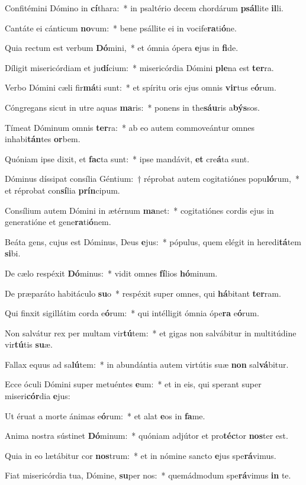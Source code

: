 \item Confitémini Dómino in \textbf{cí}thara:~* in psaltério decem chordárum \textbf{psál}lite \textbf{il}li.
\item Cantáte ei cánticum \textbf{no}vum:~* bene psállite ei in vocife\textbf{ra}ti\textbf{ó}ne.
\item Quia rectum est verbum \textbf{Dó}mini,~* et ómnia ópera \textbf{e}jus in \textbf{fi}de.
\item Díligit misericórdiam et ju\textbf{dí}cium:~* misericórdia Dómini \textbf{ple}na est \textbf{ter}ra.
\item Verbo Dómini cæli fir\textbf{má}ti sunt:~* et spíritu oris ejus omnis \textbf{vir}tus e\textbf{ó}rum.
\item Cóngregans sicut in utre aquas \textbf{ma}ris:~* ponens in the\textbf{sáu}ris a\textbf{býs}sos.
\item Tímeat Dóminum omnis \textbf{ter}ra:~* ab eo autem commoveántur omnes inhabi\textbf{tán}tes \textbf{or}bem.
\item Quóniam ipse dixit, et \textbf{fac}ta sunt:~* ipse mandávit, \textbf{et} cre\textbf{á}ta sunt.
\item Dóminus díssipat consília Géntium:~† réprobat autem cogitatiónes popu\textbf{ló}rum,~* et réprobat con\textbf{sí}lia \textbf{prín}cipum.
\item Consílium autem Dómini in ætérnum \textbf{ma}net:~* cogitatiónes cordis ejus in generatióne et gene\textbf{ra}ti\textbf{ó}nem.
\item Beáta gens, cujus est Dóminus, Deus \textbf{e}jus:~* pópulus, quem elégit in heredi\textbf{tá}tem \textbf{si}bi.
\item De cælo respéxit \textbf{Dó}minus:~* vidit omnes \textbf{fí}lios \textbf{hó}minum.
\item De præparáto habitáculo \textbf{su}o~* respéxit super omnes, qui \textbf{há}bitant \textbf{ter}ram.
\item Qui finxit sigillátim corda e\textbf{ó}rum:~* qui intélligit ómnia ópe\textbf{ra} e\textbf{ó}rum.
\item Non salvátur rex per multam vir\textbf{tú}tem:~* et gigas non salvábitur in multitúdine vir\textbf{tú}tis \textbf{su}æ.
\item Fallax equus ad sa\textbf{lú}tem:~* in abundántia autem virtútis suæ \textbf{non} sal\textbf{vá}bitur.
\item Ecce óculi Dómini super metuéntes \textbf{e}um:~* et in eis, qui sperant super miseri\textbf{cór}dia \textbf{e}jus:
\item Ut éruat a morte ánimas e\textbf{ó}rum:~* et alat \textbf{e}os in \textbf{fa}me.
\item Anima nostra sústinet \textbf{Dó}minum:~* quóniam adjútor et pro\textbf{téc}tor \textbf{nos}ter est.
\item Quia in eo lætábitur cor \textbf{nos}trum:~* et in nómine sancto \textbf{e}jus spe\textbf{rá}vimus.
\item Fiat misericórdia tua, Dómine, \textbf{su}per nos:~* quemádmodum spe\textbf{rá}vimus \textbf{in} te.
